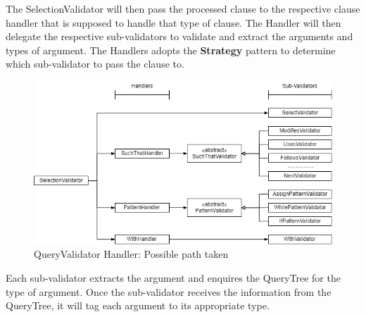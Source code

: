 \documentclass[12pt]{article}
\begin{document}
{{{{{{{{{{\begin{enumerate}
\begin{figure}[htbp]
\end{figure}
\end{enumerate}
The SelectionValidator will then pass the processed clause to the respective clause handler that is supposed to handle that type of clause. The Handler will then delegate the respective sub-validators to validate and extract the arguments and types of argument. The Handlers adopts the \textbf{Strategy} pattern to determine which sub-validator to pass the clause to.
\begin{figure}[htbp]
  \centering 
  \caption{QueryValidator Handler: Possible path taken}
 \includegraphics[width=1.0\textwidth]{QVHandler.png}
\end{figure}
Each sub-validator extracts the argument and enquires the QueryTree for the type of argument. Once the sub-validator receives the information from the QueryTree, it will tag each argument to its appropriate type.

}}}}}}}}}}
\end{document}
